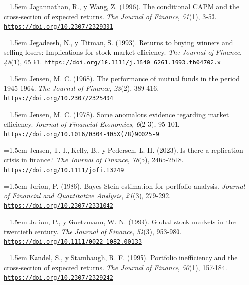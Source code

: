 \documentclass[10pt,a4paper]{article}
\begin{document}
\noindent\hangindent=1.5em Jagannathan, R., y Wang, Z. (1996). The conditional CAPM and the cross-section of expected returns. \textit{The Journal of Finance}, \textit{51}(1), 3-53. \href{https://doi.org/10.2307/2329301}{\nolinkurl{https://doi.org/10.2307/2329301}}

\noindent\hangindent=1.5em Jegadeesh, N., y Titman, S. (1993). Returns to buying winners and selling losers: Implications for stock market efficiency. \textit{The Journal of Finance}, \textit{48}(1), 65-91. \href{https://doi.org/10.1111/j.1540-6261.1993.tb04702.x}{\nolinkurl{https://doi.org/10.1111/j.1540-6261.1993.tb04702.x}}

\noindent\hangindent=1.5em Jensen, M. C. (1968). The performance of mutual funds in the period 1945-1964. \textit{The Journal of Finance}, \textit{23}(2), 389-416. \href{https://doi.org/10.2307/2325404}{\nolinkurl{https://doi.org/10.2307/2325404}}

\noindent\hangindent=1.5em Jensen, M. C. (1978). Some anomalous evidence regarding market efficiency. \textit{Journal of Financial Economics}, \textit{6}(2-3), 95-101. \href{https://doi.org/10.1016/0304-405X(78)90025-9}{\nolinkurl{https://doi.org/10.1016/0304-405X(78)90025-9}}

\noindent\hangindent=1.5em Jensen, T. I., Kelly, B., y Pedersen, L. H. (2023). Is there a replication crisis in finance? \textit{The Journal of Finance}, \textit{78}(5), 2465-2518. \href{https://doi.org/10.1111/jofi.13249}{\nolinkurl{https://doi.org/10.1111/jofi.13249}}

\noindent\hangindent=1.5em Jorion, P. (1986). Bayes-Stein estimation for portfolio analysis. \textit{Journal of Financial and Quantitative Analysis}, \textit{21}(3), 279-292. \href{https://doi.org/10.2307/2331042}{\nolinkurl{https://doi.org/10.2307/2331042}}

\noindent\hangindent=1.5em Jorion, P., y Goetzmann, W. N. (1999). Global stock markets in the twentieth century. \textit{The Journal of Finance}, \textit{54}(3), 953-980. \href{https://doi.org/10.1111/0022-1082.00133}{\nolinkurl{https://doi.org/10.1111/0022-1082.00133}}

\noindent\hangindent=1.5em Kandel, S., y Stambaugh, R. F. (1995). Portfolio inefficiency and the cross-section of expected returns. \textit{The Journal of Finance}, \textit{50}(1), 157-184. \href{https://doi.org/10.2307/2329242}{\nolinkurl{https://doi.org/10.2307/2329242}}
\end{document}

